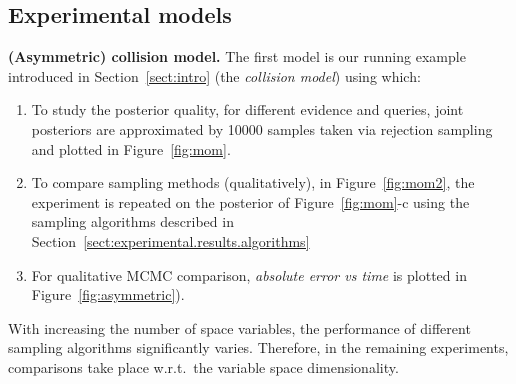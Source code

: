 \documentclass[]{article}
\begin{document}
\subsection{Experimental models}
\label{sect:experimental.results.models}


{\bf(Asymmetric) collision model.}  
The first model is our running example introduced in 
Section~\ref{sect:intro} (the \emph{collision model}) using which: 
\vspace{-2mm}
\begin{enumerate}
\item To study the posterior quality, for different evidence and queries, joint posteriors are approximated by 10000 samples taken via rejection sampling
and plotted in Figure~\ref{fig:mom}.
\item    
To  compare sampling methods (qualitatively), 
in Figure~\ref{fig:mom2}, the experiment is repeated on the posterior of 
Figure~\ref{fig:mom}-c using the sampling algorithms described in Section~\ref{sect:experimental.results.algorithms}
\item
For qualitative MCMC comparison, \emph{absolute error vs time}
is plotted in Figure~\ref{fig:asymmetric}).
\end{enumerate}

With increasing the number of space variables, the performance of different sampling algorithms significantly varies.
Therefore,
in the remaining experiments, comparisons take place w.r.t.\ the variable space dimensionality.
 
\end{document}
